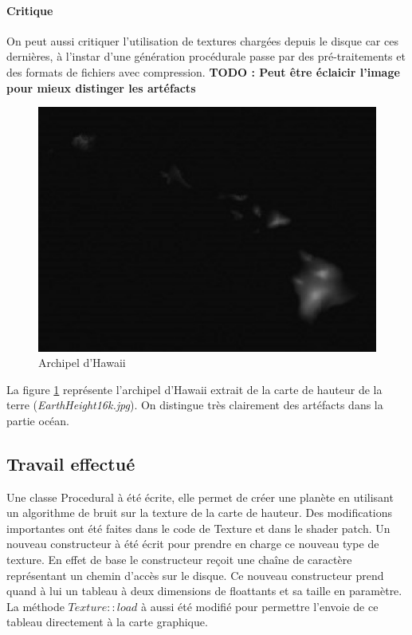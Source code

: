     \paragraph{Critique} On peut aussi critiquer l'utilisation de textures chargées depuis le disque car ces dernières, à l'instar d'une génération procédurale passe par des pré-traitements et des formats de fichiers avec compression.
    \textbf{TODO : Peut être éclaicir l'image pour mieux distinger les artéfacts}
    
    \begin{figure}
        \centering
        \includegraphics[width=12cm]{img/hawaii.png}
        \caption{Archipel d'Hawaii}
        \label{fig:hawaii}
    \end{figure}
    
    La figure \ref{fig:hawaii} représente l'archipel d'Hawaii extrait de la carte de hauteur de la terre
    (\textit{EarthHeight16k.jpg}). On distingue très clairement des artéfacts dans la partie océan.
    
    \subsection{Travail effectué}
    Une classe Procedural à été écrite, elle permet de créer une planète en utilisant un algorithme de bruit
    sur la texture de la carte de hauteur.
    Des modifications importantes ont été faites dans le code de Texture et dans le shader patch.
    Un nouveau constructeur à été écrit pour prendre en charge ce nouveau type de texture. En effet de 
    base le constructeur reçoit une chaîne de caractère représentant un chemin d'accès sur le disque.
    Ce nouveau constructeur prend quand à lui un tableau à deux dimensions de floattants et sa taille en paramètre.\\
    La méthode $Texture::load$ à aussi été modifié pour permettre l'envoie de ce tableau directement à la carte graphique.\\
    
